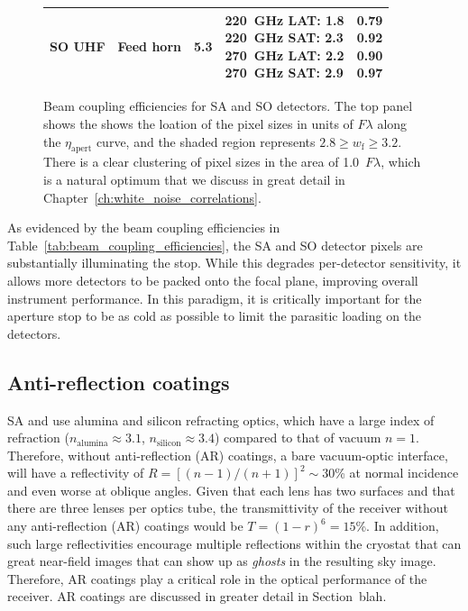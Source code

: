 \begin{figure}[!t]
\begin{tabular}{m{3.5cm}|m{3.5cm}|m{2cm}|m{3.5cm}|m{0.7cm}}
         \hline
         SO UHF & Feed horn & 5.3 & \shortstack{220~GHz LAT: 1.8 \\ 220~GHz SAT: 2.3 \\ 270~GHz LAT: 2.2 \\ 270~GHz SAT: 2.9} & \shortstack{0.79 \\ 0.92 \\ 0.90 \\ 0.97} \\
         \hline
    \end{tabular}
    \caption{Beam coupling efficiencies for SA and SO detectors. The top panel shows the shows the loation of the pixel sizes in units of $F \lambda$ along the $\eta_{\mathrm{apert}}$ curve, and the shaded region represents $2.8 \geq w_{\mathrm{f}} \geq 3.2$. There is a clear clustering of pixel sizes in the area of 1.0~$F \lambda$, which is a natural optimum that we discuss in great detail in Chapter~\ref{ch:white_noise_correlations}.}
    \label{fig:beam_coupling_eff_pixel_sizes}
\end{figure}



As evidenced by the beam coupling efficiencies in Table~\ref{tab:beam_coupling_efficiencies}, the SA and SO detector pixels are substantially illuminating the stop. While this degrades per-detector sensitivity, it allows more detectors to be packed onto the focal plane, improving overall instrument performance. In this paradigm, it is critically important for the aperture stop to be as cold as possible to limit the parasitic loading on the detectors. 


\subsection{Anti-reflection coatings}
\label{sec:instrument_overview_ar_coatings}

SA and use alumina and silicon refracting optics, which have a large index of refraction ($n_{\mathrm{alumina}} \approx 3.1$, $n_{\mathrm{silicon}} \approx 3.4$) compared to that of vacuum $n = 1$. Therefore, without anti-reflection (AR) coatings, a bare vacuum-optic interface, will have a reflectivity of $R = [(n - 1) / (n + 1)]^{2} \sim 30$\% at normal incidence and even worse at oblique angles. Given that each lens has two surfaces and that there are three lenses per optics tube, the transmittivity of the receiver without any anti-reflection (AR) coatings would be $T = (1 - r)^{6} = 15$\%. In addition, such large reflectivities encourage multiple reflections within the cryostat that can great near-field images that can show up as \textit{ghosts} in the resulting sky image. Therefore, AR coatings play a critical role in the optical performance of the receiver. AR coatings are discussed in greater detail in Section~blah.

